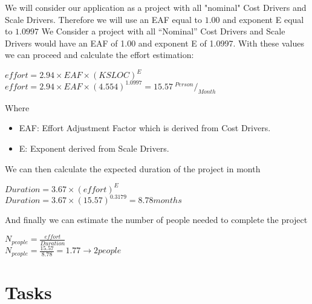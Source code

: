 \begin{itemize}
We will consider our application as a project with all "nominal" Cost Drivers and
Scale Drivers. Therefore we will use an EAF equal to $1.00$ and exponent E equal to $1.0997$
We Consider a project with all “Nominal” Cost Drivers and Scale Drivers would have an EAF
of 1.00 and exponent E of 1.0997.
With these values we can proceed and calculate the effort estimation:
\begin{center}
		$  effort = 2.94 \times EAF \times (KSLOC)^E$ \\
		$  effort = 2.94 \times EAF \times (4.554)^1.0997= 15.57 \  ^{Person}/_{Month}$
\end{center}
Where
\begin{itemize}
	\item EAF: Effort Adjustment Factor which is derived from Cost Drivers.
	\item E: Exponent derived from Scale Drivers.
\end{itemize}

We can then calculate the expected duration of the project in month
\begin{center}
	$ Duration = 3.67 \times (effort)^E $ \\
	$ Duration = 3.67 \times (15.57)^{0.3179} = 8.78 months $
\end{center}

And finally we can estimate the number of people needed to complete the project

\begin{center}
	$ N_{people} = \frac {effort}{Duration}$ \\
	$ N_{people} = \frac {15.57}{8.78} = 1.77 \rightarrow 2 people $
\end{center}

\section{Tasks}

\end{itemize}
